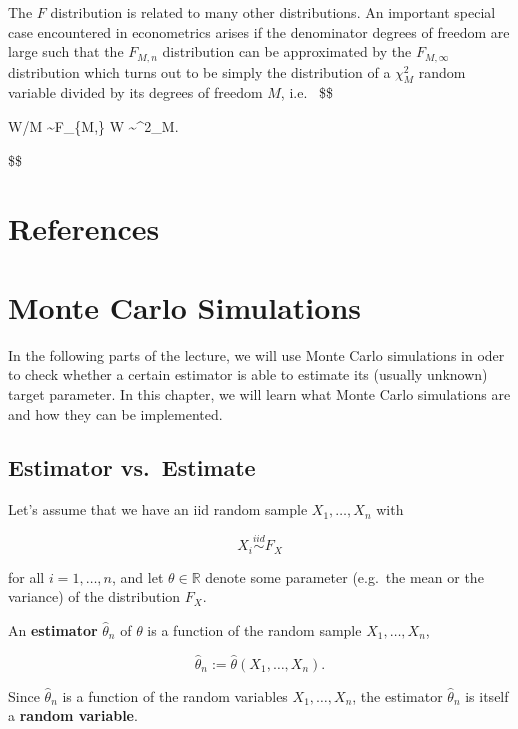 \documentclass[
  letterpaper,
  DIV=11,
  numbers=noendperiod]{scrreprt}
\theoremstyle{definition}
\theoremstyle{plain}
\theoremstyle{plain}
\theoremstyle{remark}
\begin{document}
The \(F\) distribution is related to many other distributions. An
important special case encountered in econometrics arises if the
denominator degrees of freedom are large such that the \(F_{M,n}\)
distribution can be approximated by the \(F_{M,\infty}\) distribution
which turns out to be simply the distribution of a \(\chi^2_M\) random
variable divided by its degrees of freedom \(M\), i.e.~ \$\$

W/M \sim F\_\{M,\infty\} \quad{}\quad W \sim \chi\^{}2\_M.

\$\$


\hypertarget{references}{%
\chapter*{References}\label{references}}


\hypertarget{monte-carlo-simulations}{%
\chapter{Monte Carlo Simulations}\label{monte-carlo-simulations}}

In the following parts of the lecture, we will use Monte Carlo
simulations in oder to check whether a certain estimator is able to
estimate its (usually unknown) target parameter. In this chapter, we
will learn what Monte Carlo simulations are and how they can be
implemented.

\hypertarget{estimator-vs.-estimate}{%
\section{Estimator vs.~Estimate}\label{estimator-vs.-estimate}}

Let's assume that we have an iid random sample \(X_1,\dots,X_n\) with

\[
X_i\overset{iid}{\sim} F_X
\]

for all \(i=1,\dots,n\), and let \(\theta\in\mathbb{R}\) denote some
parameter (e.g.~the mean or the variance) of the distribution \(F_X\).

An \textbf{estimator} \(\hat\theta_n\) of \(\theta\) is a function of
the random sample \(X_1,\dots,X_n\),

\[
\hat\theta_n:=\hat\theta(X_1,\dots,X_n).
\]

Since \(\hat\theta_n\) is a function of the random variables
\(X_1,\dots,X_n\), the estimator \(\hat\theta_n\) is itself a
\textbf{random variable}.
\end{document}
